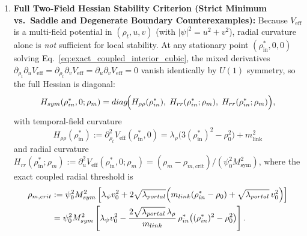 \begin{enumerate}[leftmargin=2em]
  \begin{equation}
  \lambda_\rho\,\rho_{\mathrm{in}}^*\bigl((\rho_{\mathrm{in}}^*)^2 - \rho_0^2\bigr)
  + m_{\mathrm{link}}\Bigl(m_{\mathrm{link}}(\rho_{\mathrm{in}}^* - \rho_0) + \sqrt{\lambda_{\mathrm{portal}}}\,v_0^2\Bigr) = 0.
  \label{eq:exact_coupled_interior_cubic}
  \end{equation}
  \item \textbf{Full Two-Field Hessian Stability Criterion (Strict Minimum vs.\ Saddle and Degenerate Boundary Counterexamples):} Because $V_{\mathrm{eff}}$ is a multi-field potential in $(\rho_t, u, v)$ (with $|\psi|^2 = u^2 + v^2$), radial curvature alone is \emph{not} sufficient for local stability. At any stationary point $(\rho_{\mathrm{in}}^*, 0, 0)$ solving Eq.~\eqref{eq:exact_coupled_interior_cubic}, the mixed derivatives $\partial_{\rho_t}\partial_u V_{\mathrm{eff}} = \partial_{\rho_t}\partial_v V_{\mathrm{eff}} = \partial_u\partial_v V_{\mathrm{eff}} = 0$ vanish identically by $U(1)$ symmetry, so the full Hessian is diagonal:
  \begin{equation}
  H_{\mathrm{sym}}(\rho_{\mathrm{in}}^*, 0; \rho_m) = \mathrm{diag}\!\Bigl(H_{\rho\rho}(\rho_{\mathrm{in}}^*),\; H_{rr}(\rho_{\mathrm{in}}^*; \rho_m),\; H_{rr}(\rho_{\mathrm{in}}^*; \rho_m)\Bigr),
  \label{eq:exact_two_field_sym_hessian}
  \end{equation}
  with temporal-field curvature
  \begin{equation}
  H_{\rho\rho}(\rho_{\mathrm{in}}^*) := \partial_{\rho_t}^2 V_{\mathrm{eff}}(\rho_{\mathrm{in}}^*, 0) = \lambda_\rho\bigl(3(\rho_{\mathrm{in}}^*)^2 - \rho_0^2\bigr) + m_{\mathrm{link}}^2
  \label{eq:exact_H_rhorho}
  \end{equation}
  and radial curvature $H_{rr}(\rho_{\mathrm{in}}^*; \rho_m) := \partial_u^2 V_{\mathrm{eff}}(\rho_{\mathrm{in}}^*, 0; \rho_m) = (\rho_m - \rho_{m,\mathrm{crit}})/(\psi_0^2 M_{\mathrm{sym}}^2)$, where the exact coupled radial threshold is
  \begin{align}
  \rho_{m,\mathrm{crit}}
  &:= \psi_0^2 M_{\mathrm{sym}}^2\left[\lambda_\psi v_0^2 + 2\sqrt{\lambda_{\mathrm{portal}}}\Bigl(m_{\mathrm{link}}(\rho_{\mathrm{in}}^* - \rho_0) + \sqrt{\lambda_{\mathrm{portal}}}\,v_0^2\Bigr)\right] \nonumber\\
  &= \psi_0^2 M_{\mathrm{sym}}^2\left[\lambda_\psi v_0^2 - \frac{2\sqrt{\lambda_{\mathrm{portal}}}\,\lambda_\rho}{m_{\mathrm{link}}}\,\rho_{\mathrm{in}}^*\bigl((\rho_{\mathrm{in}}^*)^2 - \rho_0^2\bigr)\right].
  \label{eq:exact_coupled_screening_threshold}

\end{align}
\end{enumerate}
